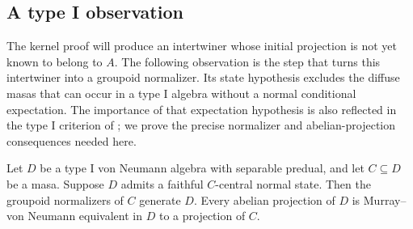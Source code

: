 \subsection{A type I observation}

The kernel proof will produce an intertwiner whose initial projection
is not yet known to belong to $A$.  The following observation is the
step that turns this intertwiner into a groupoid normalizer.  Its state
hypothesis excludes the diffuse masas that can occur in a type I
algebra without a normal conditional expectation.  The importance of
that expectation hypothesis is also reflected in the type I criterion
of \cite[Theorem~4.1]{AS12}; we prove the precise normalizer and
abelian-projection consequences needed here.

\begin{lemma}\label{lem:type-i-normalizers}
Let $D$ be a type I von Neumann algebra with separable predual, and let
$C\subseteq D$ be a masa.  Suppose $D$ admits a faithful $C$-central
normal state.  Then the groupoid normalizers of $C$ generate $D$.
Every abelian projection of $D$ is Murray--von Neumann equivalent in
$D$ to a projection of $C$.
\end{lemma}

